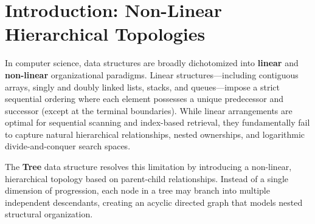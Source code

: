 \documentclass[10pt,journal,compsoc,onecolumn]{IEEEtran}
\begin{document}
\section{Introduction: Non-Linear Hierarchical Topologies}
\label{sec:intro}

In computer science, data structures are broadly dichotomized into \textbf{linear} and \textbf{non-linear} organizational paradigms. Linear structures---including contiguous arrays, singly and doubly linked lists, stacks, and queues---impose a strict sequential ordering where each element possesses a unique predecessor and successor (except at the terminal boundaries). While linear arrangements are optimal for sequential scanning and index-based retrieval, they fundamentally fail to capture natural hierarchical relationships, nested ownerships, and logarithmic divide-and-conquer search spaces.

The \textbf{Tree} data structure resolves this limitation by introducing a non-linear, hierarchical topology based on parent-child relationships. Instead of a single dimension of progression, each node in a tree may branch into multiple independent descendants, creating an acyclic directed graph that models nested structural organization.
\end{document}
